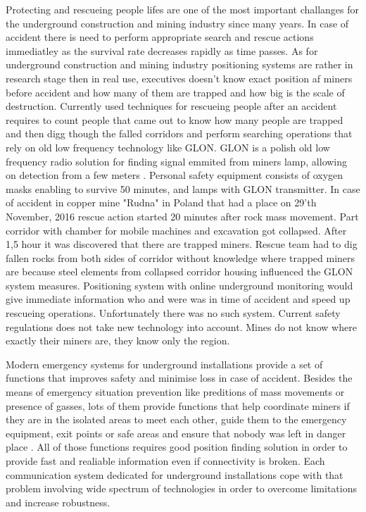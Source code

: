 \documentclass[../main.tex]{subfiles}
\begin{document}
Protecting and rescueing people lifes are one of the most important challanges for the underground construction and mining industry since many years. In case of accident there is need to perform appropriate search and rescue actions immediatley as the survival rate decreases rapidly as time passes. As for underground construction and mining industry positioning systems are rather in research stage then in real use, executives doesn't know exact position af miners before accident and how many of them are trapped and how big is the scale of destruction. Currently used techniques for rescueing people after an accident requires to count people that came out to know how many people are trapped and then digg though the falled corridors and perform searching operations that rely on old low frequency technology like GLON. GLON is a polish old low frequency radio solution for finding signal emmited from miners lamp, allowing on detection from a few meters \cite{GLON}. Personal safety equipment consists of oxygen masks enabling to survive 50 minutes, and lamps with GLON transmitter. In case of accident in copper mine "Rudna" in Poland that had a place on 29'th November, 2016  \cite{newspaper_rudna} rescue action started 20 minutes after rock mass movement. Part corridor with chamber for mobile machines and excavation got collapsed. After 1,5 hour it was discovered that there are trapped miners. Rescue team had to dig fallen rocks from both sides of corridor without knowledge where trapped miners are because steel elements from collapsed corridor housing influenced the GLON system measures. Positioning system with online underground monitoring would give immediate information who and were was in time of accident and speed up rescueing operations. Unfortunately there was no such system. Current safety regulations does not take new technology into account. Mines do not know where exactly their miners are, they know only the region.

Modern emergency systems for underground installations provide a set of functions that improves safety and minimise loss in case of accident. Besides the means of emergency situation prevention like preditions of mass movements or presence of gasses, lots of them provide functions that help coordinate miners if they are in the isolated areas to meet each other, guide them to the emergency equipment, exit points or safe areas and ensure that nobody was left in danger place \cite{Thesis_CM}. All of those functions requires good position finding solution in order to provide fast and realiable information even if connectivity is broken. Each communication system dedicated for underground installations cope with that problem involving wide spectrum of technologies in order to overcome limitations and increase robustness\cite{article_mine_communications_safety}.
\end{document}
